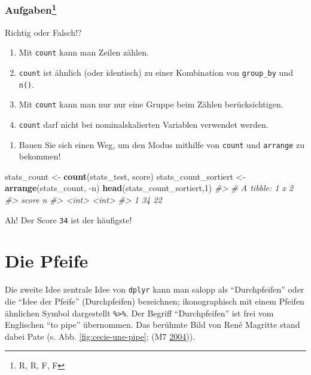 \documentclass[12pt,ngerman,]{book}
\makeatletter
\newenvironment{Shaded}{\begin{snugshade}}{\end{snugshade}}
\newcommand{\KeywordTok}[1]{\textcolor[rgb]{0.13,0.29,0.53}{\textbf{{#1}}}}
\newcommand{\DecValTok}[1]{\textcolor[rgb]{0.00,0.00,0.81}{{#1}}}
\newcommand{\StringTok}[1]{\textcolor[rgb]{0.31,0.60,0.02}{{#1}}}
\newcommand{\CommentTok}[1]{\textcolor[rgb]{0.56,0.35,0.01}{\textit{{#1}}}}
\newcommand{\NormalTok}[1]{{#1}}
\providecommand{\tightlist}{%
  \setlength{\itemsep}{0pt}\setlength{\parskip}{0pt}}
\let\rmarkdownfootnote\footnote%
\def\footnote{\protect\rmarkdownfootnote}
\newenvironment{kframe}{%
\medskip{}
\setlength{\fboxsep}{.8em}
 \def\at@end@of@kframe{}%
 \ifinner\ifhmode%
  \def\at@end@of@kframe{\end{minipage}}%
  \begin{minipage}{\columnwidth}%
 \fi\fi%
 \def\FrameCommand##1{\hskip\@totalleftmargin \hskip-\fboxsep
 \colorbox{shadecolor}{##1}\hskip-\fboxsep
     \hskip-\linewidth \hskip-\@totalleftmargin \hskip\columnwidth}%
 \MakeFramed {\advance\hsize-\width
   \@totalleftmargin\z@ \linewidth\hsize
   \@setminipage}}%
 {\par\unskip\endMakeFramed%
 \at@end@of@kframe}
\renewenvironment{Shaded}{\begin{kframe}}{\end{kframe}}
\theoremstyle{definition}
\theoremstyle{definition}
\theoremstyle{remark}
\let\BeginKnitrBlock\begin \let\EndKnitrBlock\end
\makeatother
\begin{document}
\subsubsection[Aufgaben]{\texorpdfstring{Aufgaben\footnote{R, R, F, F}}{Aufgaben}}\label{aufgaben-7}

\BeginKnitrBlock{rmdexercises}
Richtig oder Falsch!?

\begin{enumerate}
\def\labelenumi{\arabic{enumi}.}
\tightlist
\item
  Mit \texttt{count} kann man Zeilen zählen.
\item
  \texttt{count} ist ähnlich (oder identisch) zu einer Kombination von
  \texttt{group\_by} und \texttt{n()}.
\item
  Mit \texttt{count} kann man nur nur eine Gruppe beim Zählen
  berücksichtigen.
\item
  \texttt{count} darf nicht bei nominalskalierten Variablen verwendet
  werden.
\end{enumerate}
\EndKnitrBlock{rmdexercises}

\begin{enumerate}
\def\labelenumi{\arabic{enumi}.}
\tightlist
\item
  Bauen Sie sich einen Weg, um den Modus mithilfe von \texttt{count} und
  \texttt{arrange} zu bekommen!
\end{enumerate}

\begin{Shaded}
\begin{Highlighting}[]
\NormalTok{stats_count <-}\StringTok{ }\KeywordTok{count}\NormalTok{(stats_test, score)}
\NormalTok{stats_count_sortiert <-}\StringTok{ }\KeywordTok{arrange}\NormalTok{(stats_count, -n)}
\KeywordTok{head}\NormalTok{(stats_count_sortiert,}\DecValTok{1}\NormalTok{)}
\CommentTok{#> # A tibble: 1 x 2}
\CommentTok{#>   score     n}
\CommentTok{#>   <int> <int>}
\CommentTok{#> 1    34    22}
\end{Highlighting}
\end{Shaded}

Ah! Der Score \texttt{34} ist der häufigste!

\section{Die Pfeife}\label{die-pfeife}

Die zweite Idee zentrale Idee von \texttt{dplyr} kann man salopp als
``Durchpfeifen'' oder die ``Idee der Pfeife''
(Durchpfeifen) bezeichnen; ikonographisch mit einem
Pfeifen ähnlichen Symbol dargestellt \texttt{\%\textgreater{}\%}. Der
Begriff ``Durchpfeifen'' ist frei vom Englischen ``to pipe'' übernommen.
Das berühmte Bild von René Magritte stand dabei Pate (s. Abb.
\ref{fig:cecie-une-pipe}; (M7
\protect\hyperlink{ref-m7_savinellis_2004}{2004})).
\end{document}
